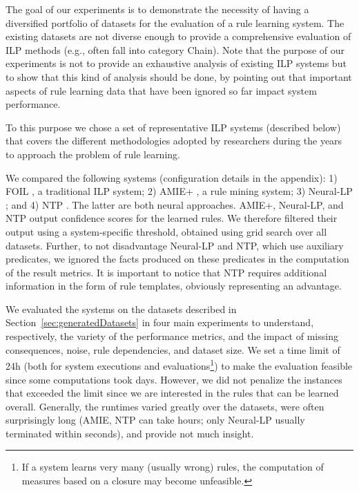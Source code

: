 \documentclass[letterpaper]{article} \usepackage{aaai20}  \usepackage{times}  \usepackage{helvet} \usepackage{courier}  \usepackage[hyphens]{url}  \usepackage{graphicx} \urlstyle{rm} \def\UrlFont{\rm}  \usepackage{graphicx}  \frenchspacing  \setlength{\pdfpagewidth}{8.5in}  \setlength{\pdfpageheight}{11in}  \usepackage{amsthm}
\theoremstyle{definition}
\begin{document}
The goal of our experiments is to demonstrate the necessity of having a diversified portfolio of datasets for the evaluation of a rule learning system. The existing datasets are not diverse enough to provide a comprehensive evaluation of ILP methods (e.g., often fall into category Chain). Note that the purpose of our experiments is not to provide an exhaustive analysis of existing ILP systems but to show that this kind of analysis should be done, by pointing out that important aspects of rule learning data that have been ignored so far impact system performance. 

To this purpose we chose a set of representative ILP systems (described below) that covers the different methodologies adopted by researchers during the years to approach the problem of rule learning.

We compared the following systems
(configuration details in the appendix): 
1) FOIL \cite{Quinlan-ML90:foil}, a traditional ILP system; 2) AMIE+ \cite{Galarraga+-VLDBJ15:amiep}, a rule mining system; 3) Neural-LP \cite{YaYaCo-NIPS17:neurallp}; and 4) NTP \cite{RoR-NIPS17}. The latter are both neural approaches.
AMIE+, Neural-LP, and NTP output confidence scores for the learned rules.
We therefore filtered their output using a system-specific threshold, obtained using grid search over all datasets.
Further, to not disadvantage Neural-LP and NTP, which use auxiliary predicates, we ignored the facts produced on these predicates in the computation of the result metrics. It is important to notice that NTP requires additional information in the form of rule templates, obviously representing an advantage. 



We evaluated the systems on the datasets described in Section~\ref{sec:generatedDatasets} in four main experiments to understand, respectively, the variety of the performance metrics, and the impact of missing consequences, noise, rule dependencies, and dataset size.
We set a time limit of 24h (both for  system executions and  evaluations\footnote{If a system learns very many (usually wrong) rules, the computation of measures based on a closure may become unfeasible.}) to make the evaluation feasible since some computations took days. However, we did not penalize the instances that exceeded the limit since we are interested in the rules that can be learned overall. Generally, the runtimes varied greatly over the datasets, were often surprisingly long (AMIE, NTP can take hours; only Neural-LP usually terminated within seconds), and provide not much insight.
\end{document}
